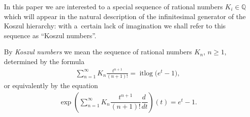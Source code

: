 \documentclass[pdftex]{sigma}
\newcommand{\Q}{\mathbb{Q}}
\numberwithin{equation}{section}
\begin{document}
In this paper we are interested to a special sequence of rational numbers $K_i\in \Q$ which will appear in the natural description of the inf\/initesimal generator of the Koszul hierarchy: with a~certain lack of imagination we shall refer to this sequence as ``Koszul numbers''.

\begin{Definition}\label{def.koszulnumbers}
By \emph{Koszul numbers} we mean the sequence of rational numbers $K_n$, $n\ge 1$, determined by the formula
\begin{gather*}\sum_{n=1}^{\infty} K_{n}\frac{t^{n+1}}{ (n+1)! }=\operatorname{itlog}\big(e^t-1\big) ,\end{gather*}
or equivalently by the equation
\begin{gather*} \exp\left(\sum_{n=1}^{\infty}K_n\dfrac{t^{n+1}}{ (n+1)! }\dfrac{d~}{ dt }\right)(t)=e^t-1 .\end{gather*}
\end{Definition}
\end{document}
